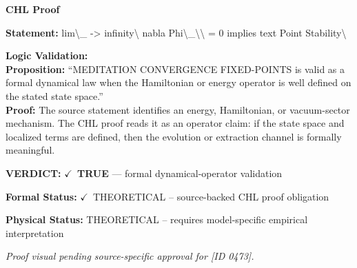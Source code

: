 \vspace{0.45em}
\noindent\textbf{CHL Proof}\par
\textbf{Statement:} lim\textbackslash{}\_ -> infinity\textbackslash{} nabla Phi\textbackslash{}\_\textbackslash{}\textbackslash{} = 0 implies text Point Stability\textbackslash{}

\textbf{Logic Validation:}\\
\textbf{Proposition:} ``MEDITATION CONVERGENCE FIXED-POINTS is valid as a formal dynamical law when the
Hamiltonian or energy operator is well defined on the stated state space.''\\
\textbf{Proof:} The source statement identifies an energy, Hamiltonian, or vacuum-sector mechanism. The
CHL proof reads it as an operator claim: if the state space and localized terms are
defined, then the evolution or extraction channel is formally meaningful.

\textbf{VERDICT:} \ensuremath{\checkmark}\ \textbf{TRUE} --- formal dynamical-operator validation

\textbf{Formal Status:} \ensuremath{\checkmark}\ THEORETICAL -- source-backed CHL proof obligation

\textbf{Physical Status:} THEORETICAL -- requires model-specific empirical interpretation
\par\vspace{0.45em}
\par
\vfill
\begingroup\footnotesize\itshape
Proof visual pending source-specific approval for [ID 0473].
\par\endgroup
\vfill
\endgroup
\endgroup
